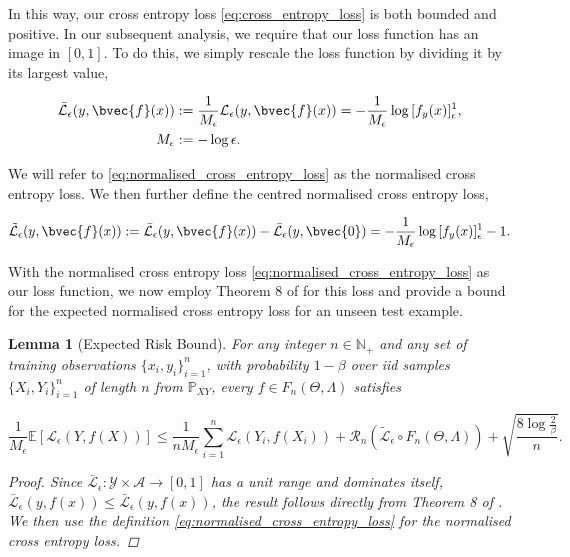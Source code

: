 \documentclass{article}
\newtheorem{lemma}[theorem]{Lemma}
\begin{document}
		In this way, our cross entropy loss \eqref{eq:cross_entropy_loss} is both bounded and positive. In our subsequent analysis, we require that our loss function has an image in $[0, 1]$. To do this, we simply rescale the loss function by dividing it by its largest value,
		
		\begin{equation}
			\begin{aligned}
				\bar{\mathcal{L}}_{\epsilon}(y, \bvec{f}(x)) &:= \frac{1}{M_{\epsilon}} \mathcal{L}_{\epsilon}(y, \bvec{f}(x)) = - \frac{1}{M_{\epsilon}} \log{ [f_{y}(x)]_{\epsilon}^{1} }, \\
				M_{\epsilon} &:= - \log{\epsilon}.
			\end{aligned}
		\label{eq:normalised_cross_entropy_loss}
		\end{equation}
		
		We will refer to \eqref{eq:normalised_cross_entropy_loss} as the normalised cross entropy loss. We then further define the centred normalised cross entropy loss,
		
		\begin{equation}
			\tilde{\mathcal{L}}_{\epsilon}(y, \bvec{f}(x)) := \bar{\mathcal{L}}_{\epsilon}(y, \bvec{f}(x)) - \bar{\mathcal{L}}_{\epsilon}(y, \bvec{0}) = - \frac{1}{M_{\epsilon}} \log{ [f_{y}(x)]_{\epsilon}^{1} } - 1.
		\label{eq:centred_normalised_cross_entropy_loss}
		\end{equation}
		
		With the normalised cross entropy loss \eqref{eq:normalised_cross_entropy_loss} as our loss function, we now employ Theorem 8 of \cite{bartlett2002rademacher} for this loss and provide a bound for the expected normalised cross entropy loss for an unseen test example.
		
		\begin{lemma}[Expected Risk Bound]
		\label{thm:expected_normalised_cross_entropy_loss_bound}
			For any integer $n \in \mathbb{N}_{+}$ and any set of training observations $\{x_{i}, y_{i}\}_{i = 1}^{n}$, with probability $1 - \beta$ over \textit{iid} samples $\{X_{i}, Y_{i}\}_{i = 1}^{n}$ of length $n$ from $\mathbb{P}_{X Y}$, every $f \in F_{n}(\Theta, \Lambda)$ satisfies
			
			\begin{equation}
				\frac{1}{M_{\epsilon}} \mathbb{E}[\mathcal{L}_{\epsilon}(Y, f(X))] \leq \frac{1}{n M_{\epsilon}} \sum_{i = 1}^{n} \mathcal{L}_{\epsilon}(Y_{i}, f(X_{i})) + \mathcal{R}_{n}(\tilde{\mathcal{L}}_{\epsilon} \circ F_{n}(\Theta, \Lambda)) + \sqrt{\frac{8 \log{\frac{2}{\beta}}}{n}}.
			\label{eq:expected_loss_bound}
			\end{equation}
			
			\begin{proof}
				Since $\bar{\mathcal{L}}_{\epsilon} : \mathcal{Y} \times \mathcal{A} \to [0, 1]$ has a unit range and dominates itself, $\bar{\mathcal{L}}_{\epsilon}(y, f(x)) \leq \bar{\mathcal{L}}_{\epsilon}(y, f(x))$, the result follows directly from Theorem 8 of \cite{bartlett2002rademacher}. We then use the definition \eqref{eq:normalised_cross_entropy_loss} for the normalised cross entropy loss.
			\end{proof}
		\end{lemma}
		
\end{document}
